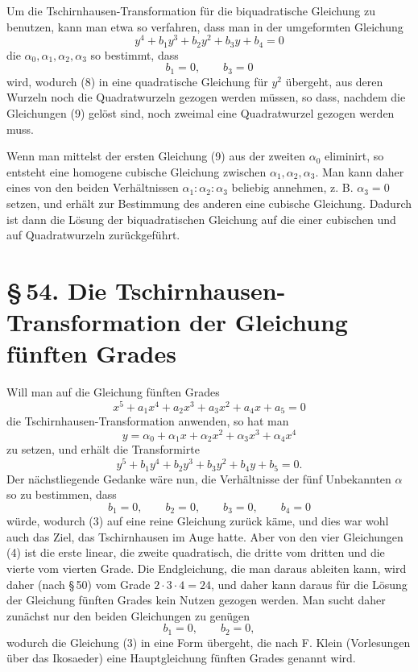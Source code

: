\documentclass[11pt]{article}
\providecommand{\sect}[2]{\section*{\S\,#1. #2}}
\begin{document}
Um die Tschirnhausen-Transformation für die biquadratische Gleichung zu benutzen, kann man etwa so verfahren, dass man in der umgeformten Gleichung
\begin{equation}
y^4+b_1y^3+b_2y^2+b_3y+b_4=0
\tag{8}
\end{equation}
die $\alpha_0,\alpha_1,\alpha_2,\alpha_3$ so bestimmt, dass
\begin{equation}
b_1=0,
\qquad
b_3=0
\tag{9}
\end{equation}
wird, wodurch (8) in eine quadratische Gleichung für $y^2$ übergeht, aus deren Wurzeln noch die Quadratwurzeln gezogen werden müssen, so dass, nachdem die Gleichungen (9) gelöst sind, noch zweimal eine Quadratwurzel gezogen werden muss.

Wenn man mittelst der ersten Gleichung (9) aus der zweiten $\alpha_0$ eliminirt, so entsteht eine homogene cubische Gleichung zwischen $\alpha_1,\alpha_2,\alpha_3$. Man kann daher eines von den beiden Verhältnissen $\alpha_1:\alpha_2:\alpha_3$ beliebig annehmen, z. B. $\alpha_3=0$ setzen, und erhält zur Bestimmung des anderen eine cubische Gleichung. Dadurch ist dann die Lösung der biquadratischen Gleichung auf die einer cubischen und auf Quadratwurzeln zurückgeführt.

\sect{54}{Die Tschirnhausen-Transformation der Gleichung fünften Grades}

Will man auf die Gleichung fünften Grades
\begin{equation}
x^5+a_1x^4+a_2x^3+a_3x^2+a_4x+a_5=0
\tag{1}
\end{equation}
die Tschirnhausen-Transformation anwenden, so hat man
\begin{equation}
y=\alpha_0+\alpha_1x+\alpha_2x^2+\alpha_3x^3+\alpha_4x^4
\tag{2}
\end{equation}
zu setzen, und erhält die Transformirte
\begin{equation}
y^5+b_1y^4+b_2y^3+b_3y^2+b_4y+b_5=0.
\tag{3}
\end{equation}
Der nächstliegende Gedanke wäre nun, die Verhältnisse der fünf Unbekannten $\alpha$ so zu bestimmen, dass
\begin{equation}
b_1=0,
\qquad b_2=0,
\qquad b_3=0,
\qquad b_4=0
\tag{4}
\end{equation}
würde, wodurch (3) auf eine reine Gleichung zurück käme, und dies war wohl auch das Ziel, das Tschirnhausen im Auge hatte. Aber von den vier Gleichungen (4) ist die erste linear, die zweite quadratisch, die dritte vom dritten und die vierte vom vierten Grade. Die Endgleichung, die man daraus ableiten kann, wird daher (nach \S\,50) vom Grade $2\cdot3\cdot4=24$, und daher kann daraus für die Lösung der Gleichung fünften Grades kein Nutzen gezogen werden. Man sucht daher zunächst nur den beiden Gleichungen zu genügen
\begin{equation}
b_1=0,
\qquad b_2=0,
\tag{5}
\end{equation}
wodurch die Gleichung (3) in eine Form übergeht, die nach F. Klein (Vorlesungen über das Ikosaeder) eine Hauptgleichung fünften Grades genannt wird.
\end{document}
